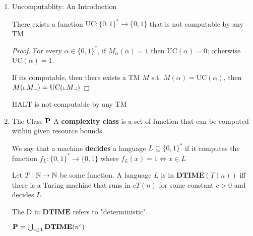 \documentclass[11pt]{article}
\def \HALT {\text{HALT}}
\def \DTIME {\textbf{DTIME}}
\begin{document}
\begin{enumerate}
\begin{proof}[Proof of relaxed version of theorem \cite{thm1.9}]
We assume \(M\) has a single work tape (in addition to the input and output tape) and uses he
alphabet \(\{\rhd,\Box,0,1\}\). The reason is that \(\calu\) can transform a representation of
every TM \(M\) into a representation of an equivalent TM \(\tilde{M}\) that satisfies these
properties. (which my takes \(C'T^2\) time)

\begin{figure}[htbp]
\centering
\texttt{[image: /media/wu/file/stuuudy/notes/images/ComputationalComplexity/3.png]}
\end{figure}
\end{proof}


\item Uncomputablity: An Introduction
\label{sec:org5c40b27}
\begin{theorem}[]
There exists a function \(\text{UC}:\{0,1\}^*\to\{0,1\}\) that is not computable by any TM
\end{theorem}

\begin{proof}
For every \(\alpha\in\{0,1\}^*\), if \(M_{\alpha}(\alpha)=1\) then \(\text{UC}(\alpha)=0\);
otherwise \(\text{UC}(\alpha)=1\).

If its computable, then there exists a TM \(M\) s.t. \(M(\alpha)=\text{UC}(\alpha)\), then
\(M(\llcorner M \lrcorner)=\text{UC}(\llcorner M \lrcorner)\)
\end{proof}

\begin{theorem}[]
\(\HALT\) is not computable by any TM
\end{theorem}

\item The Class \(\operatorname{\textbf{P}}\)
\label{sec:org34bd690}
A \textbf{complexity class} is a set of function that can be computed within given resource bounds.

We say that a machine \textbf{decides} a language \(L\subseteq\{0,1\}^*\) if it computes the
function \(f_L:\{0,1\}^*\to\{0,1\}\) where \(f_L(x)=1\Leftrightarrow x\in L\)

\begin{definition}[]
Let \(T:\mathbb{N}\to\mathbb{N}\) be some function. A language \(L\) is in \(\DTIME(T(n))\) iff there is a
Turing machine that runs in \(c\dot T(n)\) for some constant \(c>0\) and decides \(L\).
\end{definition}

The D in \(\DTIME\) refers to "deterministic".

\begin{definition}[]
\(\bP=\bigcup_{c\ge1}\DTIME(n^c)\)
\end{definition}
\end{enumerate}
\end{document}
